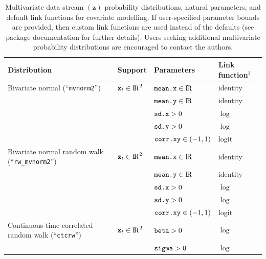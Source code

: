 \documentclass[12pt]{article}\usepackage[]{graphicx}\usepackage[]{xcolor}
\begin{document}
\begin{small}
\begin{table}
  \caption{\label{tab:multipdfs} Multivariate data stream $({\mathbf z})$ probability distributions, natural parameters, and default link functions for covariate modelling. If user-specified parameter bounds are provided, then custom link functions are used instead of the defaults (see package documentation for further details). Users seeking additional multivariate probability distributions are encouraged to contact the authors.}
  \begin{tabular}{llll}
  \toprule
  Distribution                                          & Support                         & Parameters                       & Link function$^1$ \tabularnewline
  \midrule
  \rowcolor{Gray} Bivariate normal (``\verb|mvnorm2|'') & ${\mathbf z_t}\in{\rm I\!R}^2$  & $\verb|mean.x|\in{\rm I\!R}$     &  identity \tabularnewline  
  \rowcolor{Gray}                                       &                                 & $\verb|mean.y|\in{\rm I\!R}$     &  identity \tabularnewline  
  \rowcolor{Gray}                                       &                                 & $\verb|sd.x|>0$               &  $\log$ \tabularnewline          
  \rowcolor{Gray}                                       &                                 & $\verb|sd.y|>0$               &  $\log$ \tabularnewline  
  \rowcolor{Gray}                                       &                                 & $\verb|corr.xy|\in(-1,1)$   &  logit \tabularnewline                                            
  Bivariate normal random walk (``\verb|rw_mvnorm2|'')  & ${\mathbf z_t}\in{\rm I\!R}^2$  & $\verb|mean.x|\in{\rm I\!R}$     &  identity \tabularnewline  
                                                        &                                 & $\verb|mean.y|\in{\rm I\!R}$     &  identity \tabularnewline  
                                                        &                                 & $\verb|sd.x|>0$               &  $\log$ \tabularnewline                                                                                                 &                                 & $\verb|sd.y|>0$               &  $\log$ \tabularnewline
                                                        &                                 & $\verb|corr.xy|\in(-1,1)$   &  logit \tabularnewline    
  \rowcolor{Gray} Continuous-time correlated random walk (``\verb|ctcrw|'')& ${\mathbf z_t}\in{\rm I\!R}^2$  & $\verb|beta|>0$         & $\log$ \tabularnewline
  \rowcolor{Gray}                                                          &                                 & $\verb|sigma|>0$         & $\log$ \tabularnewline

\end{tabular}
\end{table}
\end{small}
\end{document}
